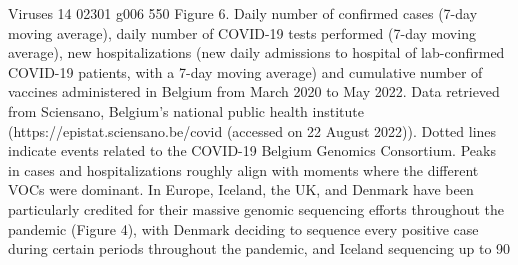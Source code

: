 Viruses 14 02301 g006 550
Figure 6. Daily number of confirmed cases (7-day moving average), daily number of COVID-19 tests performed (7-day moving average), new hospitalizations (new daily admissions to hospital of lab-confirmed COVID-19 patients, with a 7-day moving average) and cumulative number of vaccines administered in Belgium from March 2020 to May 2022. Data retrieved from Sciensano, Belgium’s national public health institute (https://epistat.sciensano.be/covid (accessed on 22 August 2022)). Dotted lines indicate events related to the COVID-19 Belgium Genomics Consortium. Peaks in cases and hospitalizations roughly align with moments where the different VOCs were dominant.
In Europe, Iceland, the UK, and Denmark have been particularly credited for their massive genomic sequencing efforts throughout the pandemic (Figure 4), with Denmark deciding to sequence every positive case during certain periods throughout the pandemic, and Iceland sequencing up to 90%
